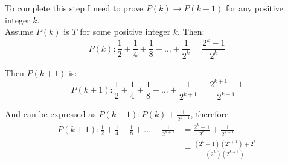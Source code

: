 \documentclass[12pt letter]{report}
\begin{document}
{\begin{enumerate}
\begin{myproof}
            To complete this step I need to prove $P \left( k \right) \to  P \left( k + 1 \right)  $ for any positive
            integer $k$. \\

            Assume $P \left( k \right) $ is $T$  for some positive integer $k$. Then:
            \[
              P \left( k \right): \frac{1}{2} + \frac{1}{4} + \frac{1}{8} + \ldots + \frac{1}{2^{k}} = \frac{2^{k} - 1}{2^{k}}
            \]

            Then $P \left( k + 1 \right) $ is:
            \[
              P \left( k + 1 \right): \frac{1}{2} + \frac{1}{4} + \frac{1}{8} + \ldots + \frac{1}{2^{k + 1}} =
              \frac{2^{k + 1} - 1}{2^{k + 1}}
            \]

            And can be expressed as $P \left( k + 1 \right): P \left( k \right) + \frac{1}{2^{k + 1}}  $, therefore
            \begin{align*}
              P \left( k + 1 \right): \frac{1}{2} + \frac{1}{4} + \frac{1}{8} + \ldots + \frac{1}{2^{k + 1}} & =
              \frac{2^{k} - 1}{2^{k}} + \frac{1}{2^{k + 1}}                                                      \\
                                                                                                             & =
              \frac{\left( 2^{k} - 1 \right) \left( 2^{k + 1} \right) + 2^{k}  }{\left(
                2^{k}\right)\left(
              2^{k + 1}\right)  }                                                                                \\
            \end{align*}

          \end{myproof}
  \end{enumerate}
}

\end{document}
